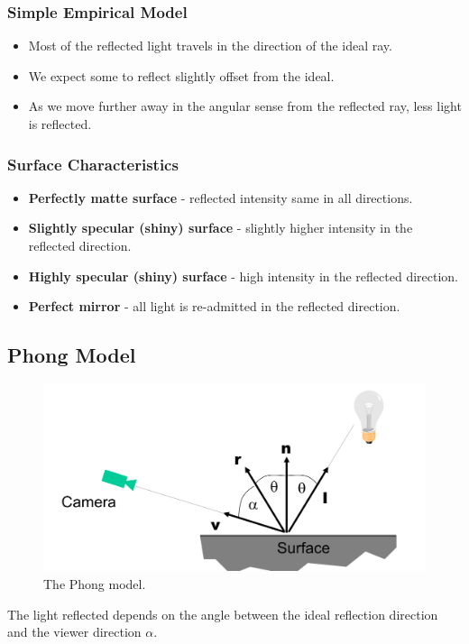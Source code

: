 \documentclass[11pt]{article}
\begin{document}
\subsubsection{Simple Empirical Model}
\begin{itemize}
  \item Most of the reflected light travels in the direction of the ideal ray.
  \item We expect some to reflect slightly offset from the ideal.
  \item As we move further away in the angular sense from the reflected ray, less light is reflected.
\end{itemize}

\subsubsection{Surface Characteristics}
\begin{itemize}
  \item \textbf{Perfectly matte surface} - reflected intensity same in all directions.
  \item \textbf{Slightly specular (shiny) surface} - slightly higher intensity in the reflected direction.
  \item \textbf{Highly specular (shiny) surface} - high intensity in the reflected direction.
  \item \textbf{Perfect mirror} - all light is re-admitted in the reflected direction.
\end{itemize}

\subsection{Phong Model}

\begin{figure}[htb!]
  \centering
  \caption{The Phong model.}
  \includegraphics[scale=0.3]{phong}
\end{figure}
The light reflected depends on the angle between the ideal reflection direction and the viewer direction $\alpha$.
\end{document}
